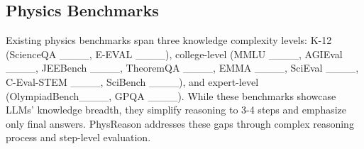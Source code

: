 \subsection{Physics Benchmarks}
Existing physics benchmarks span three knowledge complexity levels: K-12 (ScienceQA ____, E-EVAL ____), college-level (MMLU ____, AGIEval ____, JEEBench ____, TheoremQA ____, EMMA ____, SciEval ____, C-Eval-STEM ____, SciBench ____), and expert-level (OlympiadBench____, GPQA ____).
While these benchmarks showcase LLMs' knowledge breadth, they simplify reasoning to 3-4 steps and emphasize only final answers.
PhysReason addresses these gaps through complex reasoning process and step-level evaluation.
